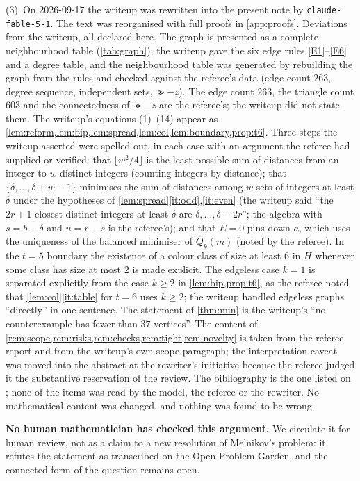 \documentclass[11pt,a4paper]{article}
\theoremstyle{plain}
\theoremstyle{definition}
\theoremstyle{remark}
\newcommand{\fl}[1]{\lfloor #1\rfloor}
\begin{document}
(3)~On 2026-09-17 the writeup was rewritten into the present note by \texttt{claude-fable-5-1}. The text was reorganised with full proofs in \cref{app:proofs}. Deviations from the writeup, all declared here. The graph is presented as a complete neighbourhood table (\cref{tab:graph}); the writeup gave the six edge rules \ref{E1}--\ref{E6} and a degree table, and the neighbourhood table was generated by rebuilding the graph from the rules and checked against the referee's data (edge count $263$, degree sequence, independent sets, $\Gt-z$). The edge count $263$, the triangle count $603$ and the connectedness of $\Gt-z$ are the referee's; the writeup did not state them. The writeup's equations (1)--(14) appear as \cref{lem:reform,lem:bip,lem:spread,lem:col,lem:boundary,prop:t6}. Three steps the writeup asserted were spelled out, in each case with an argument the referee had supplied or verified: that $\fl{w^2/4}$ is the least possible sum of distances from an integer to $w$ distinct integers (counting integers by distance); that $\{\delta,\dots,\delta+w-1\}$ minimises the sum of distances among $w$-sets of integers at least $\delta$ under the hypotheses of \cref{lem:spread}\ref{it:odd},\ref{it:even} (the writeup said ``the $2r+1$ closest distinct integers at least $\delta$ are $\delta,\dots,\delta+2r$''; the algebra with $s=b-\delta$ and $u=r-s$ is the referee's); and that $E=0$ pins down $a$, which uses the uniqueness of the balanced minimiser of $Q_k(m)$ (noted by the referee). In the $t=5$ boundary the existence of a colour class of size at least $6$ in $H$ whenever some class has size at most $2$ is made explicit. The edgeless case $k=1$ is separated explicitly from the case $k\ge2$ in \cref{lem:bip,prop:t6}, as the referee noted that \cref{lem:col}\ref{it:table} for $t=6$ uses $k\ge2$; the writeup handled edgeless graphs ``directly'' in one sentence. The statement of \cref{thm:min} is the writeup's ``no counterexample has fewer than 37 vertices''. The content of \cref{rem:scope,rem:risks,rem:checks,rem:tight,rem:novelty} is taken from the referee report and from the writeup's own scope paragraph; the interpretation caveat was moved into the abstract at the rewriter's initiative because the referee judged it the substantive reservation of the review. The bibliography is the one listed on \cite{OPG}; none of the items \cite{JT,D,N,V,Z} was read by the model, the referee or the rewriter. No mathematical content was changed, and nothing was found to be wrong.

\textbf{No human mathematician has checked this argument.} We circulate it for human review, not as a claim to a new resolution of Melnikov's problem: it refutes the statement as transcribed on the Open Problem Garden, and the connected form of the question remains open.
\end{document}
